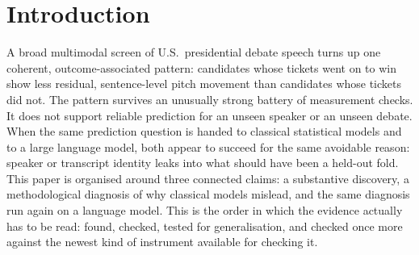 \documentclass[pdflatex,sn-mathphys-num]{sn-jnl}%
\begin{document}
{\begin{abstract}
The same limitation defeats three classical models: a decision forest, a
linear discriminant, and a weighted sum. All three call debates correctly,
until every debate containing either candidate's own voice is removed from
training. Then all three fall to chance. A large language model shows the
same pattern from a different angle. Given an anonymised transcript, it
calls the winner in $24$ of $24$ debates. But asked instead, with no
prediction question attached, to name the debate itself, it also succeeds
in $24$ of $24$ cases. Given only numeric descriptors, with nothing to
identify, its accuracy falls back to chance. In this corpus, a model's
apparent success is not evidence of having learned how winners speak;
three times over, it is a sign of what the model was allowed to see.
\end{abstract}}


\maketitle

\section{Introduction}
\label{sec:intro}

A broad multimodal screen of U.S.\ presidential debate speech turns up one
coherent, outcome-associated pattern: candidates whose tickets went on to win
show less residual, sentence-level pitch movement than candidates whose
tickets did not. The pattern survives an unusually strong battery of
measurement checks. It does not support reliable prediction for an unseen
speaker or an unseen debate. When the same prediction question is handed
to classical statistical models and to a large language model, both appear to
succeed for the same avoidable reason: speaker or transcript identity leaks
into what should have been a held-out fold. This paper is organised around
three connected claims: a substantive discovery, a methodological
diagnosis of why classical models mislead, and the same diagnosis run again
on a language model. This is the order in which the evidence
actually has to be read: found, checked, tested for generalisation, and
checked once more against the newest kind of instrument available for
checking it.
\end{document}
